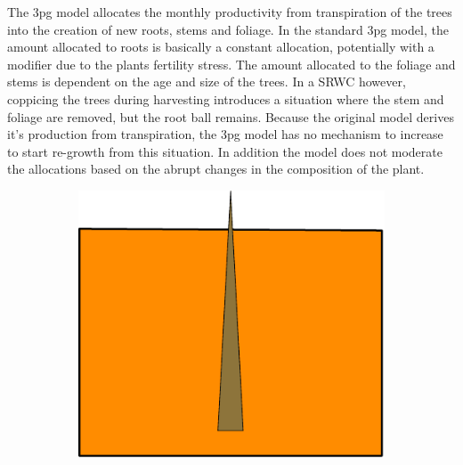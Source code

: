 \documentclass[10pt]{article}
\begin{document}
The \ac{3pg} model allocates the monthly productivity from
transpiration of the trees into the creation of new roots, stems and
foliage.  In the standard \ac{3pg} model, the amount allocated to
roots is basically a constant allocation, potentially with a modifier
due to the plants fertility stress. The amount allocated to the
foliage and stems is dependent on the age and size of the trees.  In a
\ac{SRWC} however, coppicing the trees during harvesting introduces a
situation where the stem and foliage are removed, but the root ball
remains.  Because the original model derives it's production from
transpiration, the \ac{3pg} model has no mechanism to increase to
start re-growth from this situation.  In addition the model does not
moderate the allocations based on the abrupt changes in the composition
of the plant.

\begin{figure}[!ht]
\begin{subfigure}[b]{.1125\linewidth}
\centering
\includegraphics[width=1.0\linewidth]{img/tree_pics_1}
\caption{}  %
\label{fig:grow_1}
\end{subfigure}
\begin{subfigure}[b]{.1125\linewidth}
\centering

\end{subfigure}
\end{figure}
\end{document}
